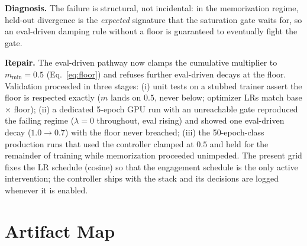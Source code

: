 \textbf{Diagnosis.} The failure is structural, not incidental: in the
memorization regime, held-out divergence is the \emph{expected}
signature that the saturation gate waits for, so an eval-driven
damping rule without a floor is guaranteed to eventually fight the
gate.

\textbf{Repair.} The eval-driven pathway now clamps the cumulative
multiplier to $m_{\min}{=}0.5$ (Eq.~\ref{eq:floor}) and refuses
further eval-driven decays at the floor. Validation proceeded in
three stages: (i) unit tests on a stubbed trainer assert the floor is
respected exactly ($m$ lands on $0.5$, never below; optimizer LRs
match base $\times$ floor); (ii) a dedicated 5-epoch GPU run with an
unreachable gate reproduced the failing regime ($\lambda{=}0$
throughout, eval rising) and showed one eval-driven decay
($1.0 \to 0.7$) with the floor never breached; (iii) the
50-epoch-class production runs that used the controller clamped at
$0.5$ and held for the remainder of training while memorization
proceeded unimpeded. The present grid fixes the LR schedule (cosine)
so that the engagement schedule is the only active intervention; the
controller ships with the stack and its decisions are logged
whenever it is enabled.

\section{Artifact Map}
\label{app:artifacts}


